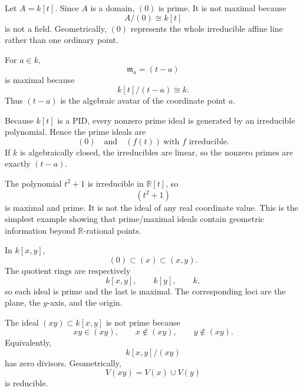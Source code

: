
\begin{example}
Let \(A=k[t]\).  Since \(A\) is a domain, \((0)\) is prime.  It is not maximal because
\[
A/(0)\cong k[t]
\]
is not a field.  Geometrically, \((0)\) represents the whole irreducible affine line rather
than one ordinary point.
\end{example}

\begin{example}
For \(a\in k\),
\[
\mathfrak m_a=(t-a)
\]
is maximal because
\[
k[t]/(t-a)\cong k.
\]
Thus \((t-a)\) is the algebraic avatar of the coordinate point \(a\).
\end{example}

\begin{example}
Because \(k[t]\) is a PID, every nonzero prime ideal is generated by an irreducible
polynomial.  Hence the prime ideals are
\[
(0)
\quad\text{and}\quad
(f(t))\ \text{with }f\text{ irreducible}.
\]
If \(k\) is algebraically closed, the irreducibles are linear, so the nonzero primes are
exactly \((t-a)\).
\end{example}

\begin{example}
The polynomial \(t^2+1\) is irreducible in \(\mathbb R[t]\), so
\[
(t^2+1)
\]
is maximal and prime.  It is not the ideal of any real coordinate value.  This is the
simplest example showing that prime/maximal ideals contain geometric information beyond
\(\mathbb R\)-rational points.
\end{example}

\begin{example}
In \(k[x,y]\),
\[
(0)\subset(x)\subset(x,y).
\]
The quotient rings are respectively
\[
k[x,y],\qquad k[y],\qquad k,
\]
so each ideal is prime and the last is maximal.  The corresponding loci are the plane, the
\(y\)-axis, and the origin.
\end{example}

\begin{example}
The ideal \((xy)\subset k[x,y]\) is not prime because
\[
xy\in(xy),
\qquad
x\notin(xy),
\qquad
y\notin(xy).
\]
Equivalently,
\[
k[x,y]/(xy)
\]
has zero divisors.  Geometrically,
\[
V(xy)=V(x)\cup V(y)
\]
is reducible.
\end{example}

